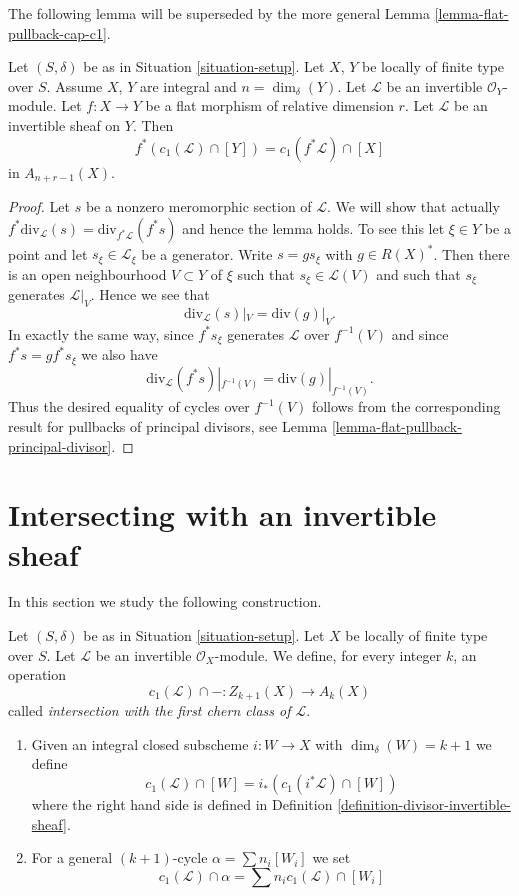 \noindent
The following lemma will be superseded by the more general
Lemma \ref{lemma-flat-pullback-cap-c1}.

\begin{lemma}
\label{lemma-flat-pullback-divisor-invertible-sheaf}
Let $(S, \delta)$ be as in Situation \ref{situation-setup}.
Let $X$, $Y$ be locally of finite type over $S$. Assume $X$, $Y$
are integral and $n = \dim_\delta(Y)$.
Let $\mathcal{L}$ be an invertible $\mathcal{O}_Y$-module.
Let $f : X \to Y$ be a flat morphism of relative dimension $r$.
Let $\mathcal{L}$ be an invertible sheaf on $Y$. Then
$$
f^*(c_1(\mathcal{L}) \cap [Y]) = c_1(f^*\mathcal{L}) \cap [X]
$$
in $A_{n + r - 1}(X)$.
\end{lemma}

\begin{proof}
Let $s$ be a nonzero meromorphic section of $\mathcal{L}$.
We will show that actually
$f^*\text{div}_\mathcal{L}(s) = \text{div}_{f^*\mathcal{L}}(f^*s)$
and hence the lemma holds.
To see this let $\xi \in Y$ be a point and let $s_\xi \in \mathcal{L}_\xi$
be a generator. Write $s = gs_\xi$ with $g \in R(X)^*$.
Then there is an open neighbourhood $V \subset Y$ of $\xi$
such that $s_\xi \in \mathcal{L}(V)$ and such that $s_\xi$ generates
$\mathcal{L}|_V$. Hence we see that
$$
\text{div}_\mathcal{L}(s)|_V = \text{div}(g)|_V.
$$
In exactly the same way, since $f^*s_\xi$ generates $\mathcal{L}$
over $f^{-1}(V)$ and since $f^*s = g f^*s_\xi$ we also
have
$$
\text{div}_\mathcal{L}(f^*s)|_{f^{-1}(V)}
=
\text{div}(g)|_{f^{-1}(V)}.
$$
Thus the desired equality of cycles over $f^{-1}(V)$ follows from the
corresponding result for pullbacks of principal divisors, see
Lemma \ref{lemma-flat-pullback-principal-divisor}.
\end{proof}



\section{Intersecting with an invertible sheaf}
\label{section-intersecting-with-divisors}

\noindent
In this section we study the following construction.

\begin{definition}
\label{definition-cap-c1}
Let $(S, \delta)$ be as in Situation \ref{situation-setup}.
Let $X$ be locally of finite type over $S$.
Let $\mathcal{L}$ be an invertible $\mathcal{O}_X$-module.
We define, for every integer $k$, an operation
$$
c_1(\mathcal{L}) \cap - :
Z_{k + 1}(X) \to A_k(X)
$$
called {\it intersection with the first chern class of $\mathcal{L}$}.
\begin{enumerate}
\item Given an integral closed subscheme $i : W \to X$ with
$\dim_\delta(W) = k + 1$ we define
$$
c_1(\mathcal{L}) \cap [W] = i_*(c_1({i^*\mathcal{L}}) \cap [W])
$$
where the right hand side is defined in
Definition \ref{definition-divisor-invertible-sheaf}.
\item For a general $(k + 1)$-cycle $\alpha = \sum n_i [W_i]$ we set
$$
c_1(\mathcal{L}) \cap \alpha = \sum n_i c_1(\mathcal{L}) \cap [W_i]
$$
\end{enumerate}
\end{definition}

